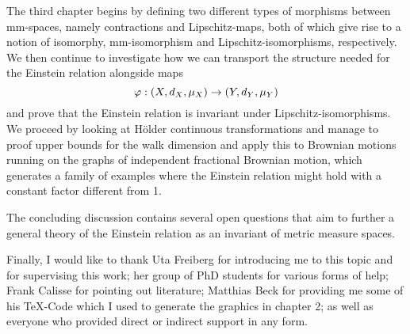 The third chapter begins by defining two different types of morphisms between mm-spaces, namely contractions and Lipschitz-maps, both of which give rise to a notion of isomorphy, mm-isomorphism and Lipschitz-isomorphisms, respectively. We then continue to investigate how we can transport the structure needed for the Einstein relation alongside maps 
\[
  \varphi:(X,d_X,\mu_X)\to (Y,d_Y,\mu_Y)
\]
and prove that the Einstein relation is invariant under Lipschitz-isomorphisms. We proceed by looking at H\"older continuous transformations and manage to proof upper bounds for the walk dimension and apply this to Brownian motions running on the graphs of independent fractional Brownian motion, which generates a family of examples where the Einstein relation might hold with a constant factor different from 1.  

The concluding discussion contains several open questions that aim to further a general theory of the Einstein relation as an invariant of metric measure spaces.

Finally, I would like to thank Uta Freiberg for introducing me to this topic and for supervising this work; her group of PhD students for various forms of help; Frank Calisse for pointing out literature; Matthias Beck for providing me some of his \TeX-Code which I used to generate the graphics in chapter 2; as well as everyone who provided direct or indirect support in any form. 
